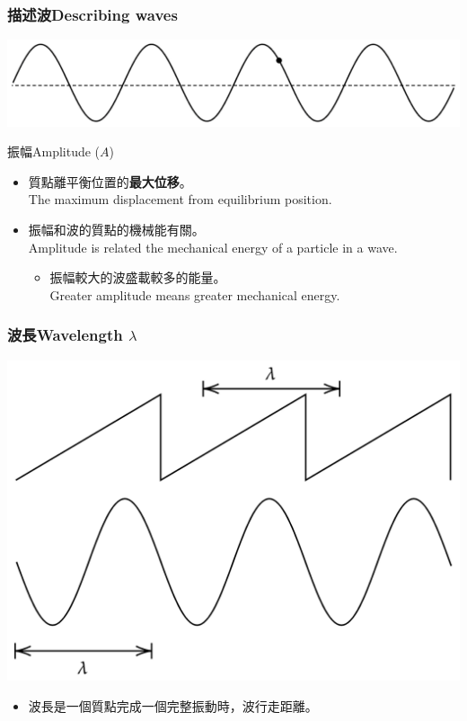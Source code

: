 \documentclass[beamer=true]{standalone}
\begin{document}
\begin{frame}
    \frametitle{描述波Describing waves}
    \par{\par\centering\includegraphics[width=.75\textwidth]{./img/ch1_2024-05-06-20-43-46.png}\par}
    \begin{block}{振幅Amplitude ($A$)}
        \begin{itemize}
            \item 質點離平衡位置的\textbf{最大位移}。\\The maximum displacement from equilibrium position.
            \item 振幅和波的質點的機械能有關。\\Amplitude is related the mechanical energy of a particle in a wave.
                  \begin{itemize}
                      \item 振幅較大的波盛載較多的能量。\\Greater amplitude means greater mechanical energy.
                  \end{itemize}
        \end{itemize}
    \end{block}
\end{frame}

\begin{frame}
    \frametitle{波長Wavelength $\lambda$}

    \par{\par\centering\includegraphics[width=.6\textwidth]{./img/ch1_2024-05-06-21-13-45.png}\par}

    \begin{itemize}
        \item 波長是一個質點完成一個完整振動時，波行走距離。
    \end{itemize}
\end{frame}
\end{document}
